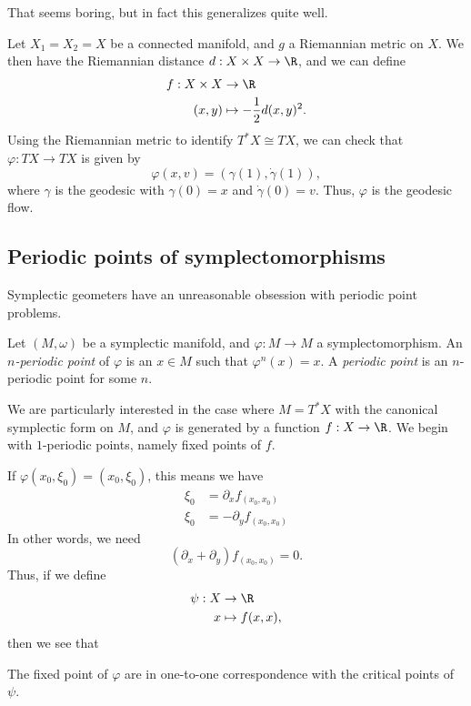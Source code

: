 \documentclass[a4paper]{article}
\begin{document}
That seems boring, but in fact this generalizes quite well.
\begin{eg}
  Let $X_1 = X_2 = X$ be a connected manifold, and $g$ a Riemannian metric on $X$. We then have the Riemannian distance $d: X \times X \to \R$, and we can define
  \begin{align*}
    f: X \times X &\to \R\\
    (x, y) &\mapsto - \frac{1}{2} d(x, y)^2.
  \end{align*}
  Using the Riemannian metric to identify $T^*X \cong TX$, we can check that $\varphi: TX \to TX$ is given by
  \[
    \varphi(x, v) = (\gamma(1), \dot{\gamma}(1)),
  \]
  where $\gamma$ is the geodesic with $\gamma(0) = x$ and $\dot{\gamma}(0) = v$. Thus, $\varphi$ is the geodesic flow.
\end{eg}

\subsection{Periodic points of symplectomorphisms}
Symplectic geometers have an unreasonable obsession with periodic point problems.

\begin{defi}
  Let $(M, \omega)$ be a symplectic manifold, and $\varphi: M \to M$ a symplectomorphism. An \emph{$n$-periodic point} of $\varphi$ is an $x \in M$ such that $\varphi^n(x) = x$. A \emph{periodic point} is an $n$-periodic point for some $n$.
\end{defi}

We are particularly interested in the case where $M = T^*X$ with the canonical symplectic form on $M$, and $\varphi$ is generated by a function $f: X \to \R$. We begin with $1$-periodic points, namely fixed points of $f$.

If $\varphi(x_0, \xi_0) = (x_0, \xi_0)$, this means we have
\begin{align*}
  \xi_0 &= \partial_x f_{(x_0, x_0)}\\
  \xi_0 &= -\partial_y f_{(x_0, x_0)}
\end{align*}
In other words, we need
\[
  (\partial_x + \partial_y) f_{(x_0, x_0)} = 0.
\]
Thus, if we define
\begin{align*}
  \psi: X &\to \R\\
  x &\mapsto f(x, x),
\end{align*}
then we see that
\begin{prop}
  The fixed point of $\varphi$ are in one-to-one correspondence with the critical points of $\psi$.
\end{prop}
\end{document}

